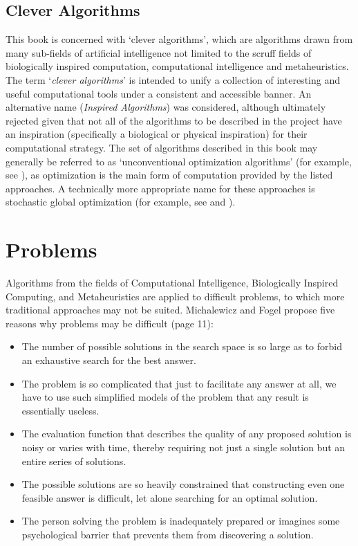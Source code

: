 \begin{bibunit}
% 
% 
\subsection{Clever Algorithms}
\label{sec:clever_algorithms}
This book is concerned with `clever algorithms', which are algorithms drawn from many sub-fields of artificial intelligence not limited to the scruff fields of biologically inspired computation, computational intelligence and metaheuristics. 
The term `\emph{clever algorithms}' is intended to unify a collection of interesting and useful computational tools under a consistent and accessible banner. An alternative name (\emph{Inspired Algorithms}) was considered, although ultimately rejected given that not all of the algorithms to be described in the project have an inspiration (specifically a biological or physical inspiration) for their computational strategy. 
The set of algorithms described in this book may generally be referred to as `unconventional optimization algorithms' (for example, see \cite{Corne1999}), as optimization is the main form of computation provided by the listed approaches. A technically more appropriate name for these approaches is stochastic global optimization (for example, see \cite{Weise2007} and \cite{Luke2009}).

% 
% 
\section{Problems}
\label{sec:problems}
Algorithms from the fields of Computational Intelligence, Biologically Inspired Computing, and Metaheuristics are applied to difficult problems, to which more traditional approaches may not be suited.
Michalewicz and Fogel propose five reasons why problems may be difficult \cite{Michalewicz2004} (page 11):
\begin{itemize}
	\item The number of possible solutions in the search space is so large as to forbid an exhaustive search for the best answer.
	\item The problem is so complicated that just to facilitate any answer at all, we have to use such simplified models of the problem that any result is essentially useless.
	\item The evaluation function that describes the quality of any proposed solution is noisy or varies with time, thereby requiring not just a single solution but an entire series of solutions.
	\item The possible solutions are so heavily constrained that constructing even one feasible answer is difficult, let alone searching for an optimal solution.
	\item The person solving the problem is inadequately prepared or imagines some psychological barrier that prevents them from discovering a solution.
\end{itemize}


\end{bibunit}
